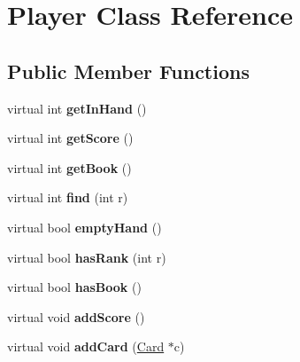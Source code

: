 \hypertarget{class_player}{\section{Player Class Reference}
\label{class_player}
}
\subsection*{Public Member Functions}
\begin{DoxyCompactItemize}
\item 
\hypertarget{class_player_a3ef0954ff3b08c5f0e80de3788673039}{virtual int {\bfseries get\-In\-Hand} ()}\label{class_player_a3ef0954ff3b08c5f0e80de3788673039}

\item 
\hypertarget{class_player_a97e5447778ae6c384eedc532dcd8431d}{virtual int {\bfseries get\-Score} ()}\label{class_player_a97e5447778ae6c384eedc532dcd8431d}

\item 
\hypertarget{class_player_a140ba77ca3c45f29a90e2750b92bb62c}{virtual int {\bfseries get\-Book} ()}\label{class_player_a140ba77ca3c45f29a90e2750b92bb62c}

\item 
\hypertarget{class_player_a16f9c092093c6bfece20a21491bd2321}{virtual int {\bfseries find} (int r)}\label{class_player_a16f9c092093c6bfece20a21491bd2321}

\item 
\hypertarget{class_player_a47fc7e8a3e18d535c31350977e4d7589}{virtual bool {\bfseries empty\-Hand} ()}\label{class_player_a47fc7e8a3e18d535c31350977e4d7589}

\item 
\hypertarget{class_player_aab2df1c8a2c7d9dba1b08bf70716c4ab}{virtual bool {\bfseries has\-Rank} (int r)}\label{class_player_aab2df1c8a2c7d9dba1b08bf70716c4ab}

\item 
\hypertarget{class_player_aca9e00e81988c67c24f26ec9c8e8c0dd}{virtual bool {\bfseries has\-Book} ()}\label{class_player_aca9e00e81988c67c24f26ec9c8e8c0dd}

\item 
\hypertarget{class_player_accad59b63ac103fe92a11e8d52207e70}{virtual void {\bfseries add\-Score} ()}\label{class_player_accad59b63ac103fe92a11e8d52207e70}

\item 
\hypertarget{class_player_a8ee60620d92bd87c45c8125cfdb47d3f}{virtual void {\bfseries add\-Card} (\hyperlink{class_card}{Card} $\ast$c)}\label{class_player_a8ee60620d92bd87c45c8125cfdb47d3f}


\end{DoxyCompactItemize}
